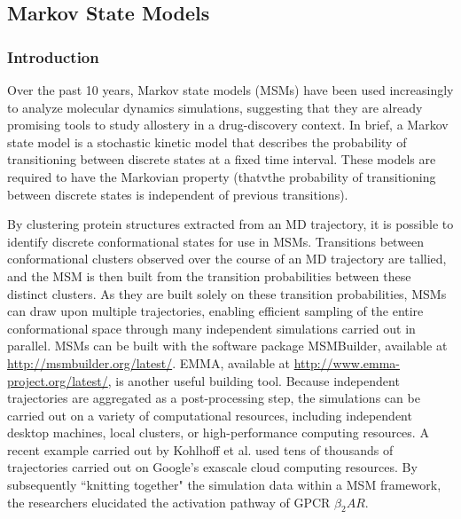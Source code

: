 \subsection{Markov State Models}
\subsubsection{Introduction}
\par Over the past 10 years, Markov state models (MSMs) have been used increasingly to analyze molecular dynamics simulations, suggesting that they are already promising tools to study allostery in a drug-discovery context.\cite{Pande2010a,Schwantes2014a,Chodera2014a,Malmstrom2014,Shukla2015,Bowman2015b} In brief, a Markov state model is a stochastic kinetic model that describes the probability of transitioning between discrete states at a fixed time interval.\cite{Beauchamp2011a,Pande2010a,Prinz2011c} These models are required to have the Markovian property (\ie thatvthe probability of transitioning between discrete states is independent of previous transitions).


\par By clustering protein structures extracted from an MD trajectory, it is possible to identify discrete conformational states for use in MSMs.\cite{Beauchamp2011a,Pande2010a,Prinz2011c} Transitions between conformational clusters observed over the course of an MD trajectory are tallied, and the MSM is then built from the transition probabilities between these distinct clusters. As they are built solely on these transition probabilities, MSMs can draw upon multiple trajectories, enabling efficient sampling of the entire conformational space through many independent simulations carried out in parallel. MSMs can be built with the software package MSMBuilder, available at \url{http://msmbuilder.org/latest/}.\cite{Beauchamp2011a} EMMA\cite{Senne2012}, available at \url{http://www.emma-project.org/latest/}, is another useful building tool. Because independent trajectories are aggregated as a post-processing step, the simulations can be carried out on a variety of computational resources, including independent desktop machines, local clusters, or high-performance computing resources. A recent example carried out by Kohlhoff et al. used tens of thousands of trajectories carried out on Google’s exascale cloud computing resources. By subsequently ``knitting together" the simulation data within a MSM framework, the researchers elucidated the activation pathway of GPCR $\beta_2AR$.\cite{Kohlhoff2014}


